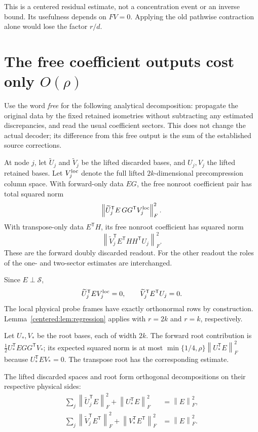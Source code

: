\documentclass[11pt,oneside,openany,a4paper]{book}
\numberwithin{equation}{chapter}
\theoremstyle{definition}
\theoremstyle{remark}
\newcommand{\F}[1]{\left\lVert#1\right\rVert_F}
\begin{document}
This is a centered residual estimate, not a concentration event or an inverse bound. Its usefulness depends on $FV=0$. Applying the old pathwise contraction alone would lose the factor $r/d$.

\section{The free coefficient outputs cost only \texorpdfstring{$O(\rho)$}{O(rho)}}\label{centered:sec:free}
Use the word \emph{free} for the following analytical decomposition: propagate the original data by the fixed retained isometries without subtracting any estimated discrepancies, and read the usual coefficient sectors. This does not change the actual decoder; its difference from this free output is the sum of the established source corrections.

At node $j$, let $\widetilde U_j$ and $\widetilde V_j$ be the lifted discarded bases, and $U_j,V_j$ the lifted retained bases. Let $V_j^{\rm loc}$ denote the full lifted $2k$-dimensional precompression column space. With forward-only data $EG$, the free nonroot coefficient pair has total squared norm
\[
 \F{\widetilde U_j^{\mathsf T}E\,GG^{\mathsf T}V_j^{\rm loc}}^2.
\]
With transpose-only data $E^{\mathsf T}H$, its free nonroot coefficient has squared norm
\[
 \F{\widetilde V_j^{\mathsf T}E^{\mathsf T}HH^{\mathsf T}U_j}^2.
\]
These are the forward doubly discarded readout. For the other readout the roles of the one- and two-sector estimates are interchanged.

Since $E\perp\mathcal S$,
\begin{equation}\label{centered:eq:zero}
 \widetilde U_j^{\mathsf T}EV_j^{\rm loc}=0,\qquad
 \widetilde V_j^{\mathsf T}E^{\mathsf T}U_j=0.
\end{equation}
The local physical probe frames have exactly orthonormal rows by construction. Lemma~\ref{centered:lem:regression} applies with $r=2k$ and $r=k$, respectively.

Let $U_*,V_*$ be the root bases, each of width $2k$. The forward root contribution is
$\frac12U_*^{\mathsf T}EGG^{\mathsf T}V_*$; its expected squared norm is at most
$\min\{1/4,\rho\}\F{U_*^{\mathsf T}E}^2$ because $U_*^{\mathsf T}EV_*=0$. The transpose root has the corresponding estimate.

The lifted discarded spaces and root form orthogonal decompositions on their respective physical sides:
\begin{align*}
 \sum_j\F{\widetilde U_j^{\mathsf T}E}^2+\F{U_*^{\mathsf T}E}^2&=\F E^2,\\
 \sum_j\F{\widetilde V_j^{\mathsf T}E^{\mathsf T}}^2+\F{V_*^{\mathsf T}E^{\mathsf T}}^2&=\F E^2.
\end{align*}
\end{document}

